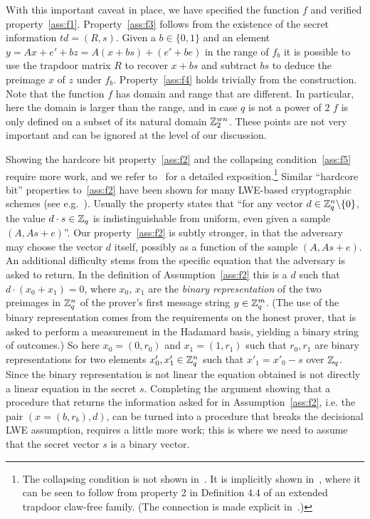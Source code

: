 With this important caveat in place, we have specified the function $f$ and verified property~\ref{ass:f1}. Property~\ref{ass:f3} follows from the existence of the secret information $td=(R,s)$. Given a $b\in\{0,1\}$ and an element $y=Ax+e'+bz = A(x+bs)+(e'+be)$ in the range of $f_b$  it is possible to use the trapdoor matrix $R$ to recover $x+bs$ and subtract $bs$ to deduce the preimage $x$ of $z$ under $f_b$. Property~\ref{ass:f4} holds trivially from the construction. Note that the function $f$ has domain and range that are different. In particular, here the domain is larger than the range, and in case $q$ is not a power of $2$ $f$ is only defined on a subset of its natural domain $\mathbb{Z}_2^{wn}$. These points are not very important and can be ignored at the level of our discussion. 

Showing the hardcore bit property~\ref{ass:f2} and the collapsing condition~\ref{ass:f5} require more work, and we refer to~\cite{brakerski2018cryptographic} for a detailed exposition.\footnote{The collapsing condition is not shown in~\cite{brakerski2018cryptographic}. It is implicitly shown in~\cite{mahadev2018classical}, where it can be seen to follow from property 2 in Definition 4.4 of an extended trapdoor claw-free family. (The connection is made explicit in~\cite{gheorghiu2019computationally}.)}
 Similar ``hardcore bit'' properties to~\ref{ass:f2} have been shown for many LWE-based cryptographic schemes (see e.g.~\cite{akavia2009simultaneous}). Usually the property states that ``for any vector $d\in\mathbb{Z}_q^n\backslash\{0\}$, the value $d\cdot s\in\mathbb{Z}_q$ is indistinguishable from uniform, even given a sample $(A,As+e)$''. Our property~\ref{ass:f2} is subtly stronger, in that the adversary may choose the vector $d$ itself, possibly as a function of the sample $(A,As+e)$. An additional difficulty stems from the specific equation that the adversary is asked to return. In the definition of Assumption~\ref{ass:f2} this is a $d$ such that $d\cdot (x_0+x_1)=0$, where $x_0$, $x_1$ are the \emph{binary representation} of the two preimages in $\mathbb{Z}_q^n$ of the prover's first message string $y\in \mathbb{Z}_q^m$. (The use of the binary representation comes from the requirements on the honest prover, that is asked to perform a measurement in the Hadamard basis, yielding a binary string of outcomes.) So here $x_0=(0,r_0)$ and $x_1=(1,r_1)$ such that $r_0,r_1$ are binary representations for two elements $x'_0,x'_1\in \mathbb{Z}_q^n$ such that $x'_1=x'_0-s$ over $\mathbb{Z}_q$. Since the binary representation is not linear the equation obtained is not directly a linear equation in the secret $s$. Completing  the argument showing that a procedure that returns the information asked for in Assumption~\ref{ass:f2}, i.e. the pair $(x=(b,r_b),d)$, can be turned into a procedure that breaks the decisional LWE assumption, requires a little more work; this is where we need to assume that the secret vector $s$ is a binary vector. 